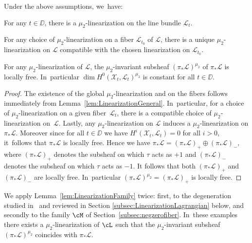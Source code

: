 \begin{lemm}\label{lem:LinearizationFamily}
Under the above assumptions, we~have:
\begin{enumeratea}
\item\label{enum:LinearizationFamily1} For any $t\in\DD$, there is a $\mu_2$-linearization on the line bundle $\mathcal{L}_t$.
\item For any choice of $\mu_2$-linearization on a fiber $\mathcal{L}_{t_0}$ of $\mathcal{L}$, there is a unique $\mu_2$\nobreakdash-linearization on $\mathcal{L}$ compatible with the chosen linearization on $\mathcal{L}_{t_0}$.
\item \label{eq:lemmconcl3} For any $\mu_2$-linearization of $\mathcal{L}$, the $\mu_2$-invariant subsheaf $(\pi_*\mathcal{L})^{\mu_2}$ of $\pi_*\mathcal{L}$ is locally free. In~particular $\dim H^0(\mathcal{X}_t,\mathcal{L}_t)^{\mu_2}$ is constant for all $t\in\DD$.
\end{enumeratea}
\end{lemm}

\begin{proof}
The existence of the global $\mu_2$-linearization and on the fibers follows immediately from Lemma~\ref{lem:LinearizationGeneral}. In~particular, for a choice of $\mu_2$-linearization on a given fiber~$\mathcal{L}_t$, there is a compatible choice of $\mu_2$-linearization on~$\mathcal{L}$.
Lastly, any $\mu_2$-linearization on $\mathcal{L}$ induces a $\mu_2$-linearization on $\pi_*\mathcal{L}$.
Moreover since for all $t\in \DD$ we have $H^i(\mathcal{X}_t,\mathcal{L}_t)=0$ for all $i>0$, it~follows that $\pi_*\mathcal{L}$ is locally free.
Hence we have $\pi_*\mathcal{L}=(\pi_*\mathcal{L})_+\oplus (\pi_*\mathcal{L})_-$, where $(\pi_*\mathcal{L})_+$ denotes the subsheaf on which $\tau$ acts as $+1$ and $(\pi_*\mathcal{L})_-$ denotes the subsheaf on which $\tau$ acts as $-1$.
It follows that both $(\pi_*\mathcal{L})_+$ and $(\pi_*\mathcal{L})_-$ are locally free. In~particular $(\pi_*\mathcal{L})^{\mu_2}=(\pi_*\mathcal{L})_+$ is locally free.
\end{proof}

We apply Lemma~\ref{lem:LinearizationFamily} twice: first, to the degeneration studied in~\cite{involutions1} and reviewed in Section \ref{subsec:LinearizationLagrangian} below, and secondly to the family $\cM$ of Section~\ref{subsec:negzerofiber}. In~these examples there exists a $\mu_2$-linearization of $\cL$ such that the $\mu_2$-invariant subsheaf $(\pi_*\mathcal{L})^{\mu_2}$ coincides with $\pi_*\mathcal{L}$.

